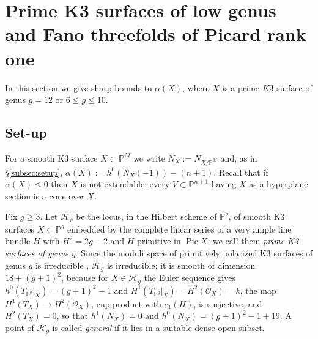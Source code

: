 \documentclass[11pt,reqno]{amsart}
\theoremstyle{plain}
\theoremstyle{definition}
\newtheorem{remark}[theorem]{Remark}
\newcommand{\PP}{\mathbb{P}}
\newcommand{\PM}{\mathbb{P}^M}
\newcommand{\OO}{\mathcal{O}}
\renewcommand{\Im}{\operatorname{Im}}
\newcommand{\Yt}{\widetilde{Y}}
\newcommand{\Ct}{\widetilde{C}}
\newcommand{\yt}{\tilde{y}}
\newcommand{\GH}{G_H}
\newcommand{\Dd}{D}
\begin{document}

\section{Prime K3 surfaces of low genus and Fano threefolds of Picard rank one}\label{sec:fano}

In this section we give sharp bounds to $\alpha(X)$, where $X$ is a prime $K3$ surface of genus $g = 12$ or $6 \leq g \leq 10$.

\subsection{Set-up}\label{subsec:fano-setup}

For a smooth K3 surface $X\subset\PP^M$ we write $N_X:=N_{X/\PP^M}$ and, as in \S\ref{subsec:setup}, $\alpha(X):=h^0(N_X(-1))-(n+1)$. Recall \cite{Zak91,Lvo92} that if $\alpha(X)\le0$ then $X$ is not extendable: every $V\subset\PP^{n+1}$ having $X$ as a hyperplane section is a cone over $X$.

Fix $g\ge3$. Let $\mathcal H_g$ be the locus, in the Hilbert scheme of $\PP^g$, of smooth K3 surfaces $X\subset\PP^g$ embedded by the complete linear series of a very ample line bundle $H$ with $H^2=2g-2$ and $H$ primitive in $\operatorname{Pic}X$; we call them \emph{prime K3 surfaces of genus $g$}. Since the moduli space of primitively polarized K3 surfaces of genus $g$ is irreducible \cite[Ch.~6]{Huy16}, $\mathcal H_g$ is irreducible; it is smooth of dimension $18+(g+1)^2$, because for $X\in\mathcal H_g$ the Euler sequence gives $h^0(T_{\PP^g}|_X)=(g+1)^2-1$ and $H^1(T_{\PP^g}|_X)=H^2(\OO_X)=k$, the map $H^1(T_X)\to H^2(\OO_X)$, cup product with $c_1(H)$, is surjective, and $H^2(T_X)=0$, so that $h^1(N_X)=0$ and $h^0(N_X)=(g+1)^2-1+19$. A point of $\mathcal H_g$ is called \emph{general} if it lies in a suitable dense open subset.
\end{document}
